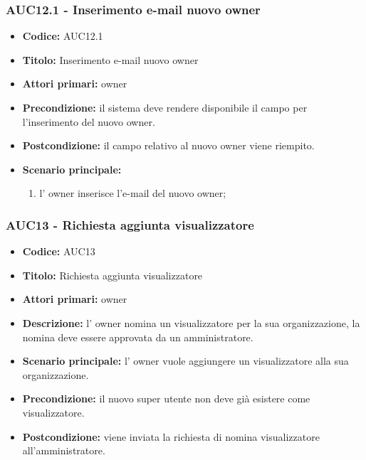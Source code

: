 \documentclass[casi-duso]{subfiles}
\begin{document}
\subsubsection{AUC12.1 - Inserimento e-mail nuovo owner}%
\label{subsub:AUC12.1}
\begin{itemize}
  \item \textbf{Codice:} AUC12.1
  \item \textbf{Titolo:} Inserimento e-mail nuovo owner
  \item \textbf{Attori primari:} owner
  \item \textbf{Precondizione:} il sistema deve rendere disponibile il campo per l'inserimento del nuovo owner.
  \item \textbf{Postcondizione:} il campo relativo al nuovo owner viene riempito.
  \item \textbf{Scenario principale:} 
  \begin{enumerate}
    \item l' owner inserisce l'e-mail del nuovo owner;
  \end{enumerate}
\end{itemize}

\subsubsection{AUC13 - Richiesta aggiunta visualizzatore}%
\label{subsub:AUC13}
\begin{itemize}
  \item \textbf{Codice:} AUC13
  \item \textbf{Titolo:} Richiesta aggiunta visualizzatore
  \item \textbf{Attori primari:} owner
  \item \textbf{Descrizione:} l' owner nomina un visualizzatore per la sua organizzazione, la nomina deve essere approvata da un amministratore.
  \item \textbf{Scenario principale:} l' owner vuole aggiungere un visualizzatore alla sua organizzazione.
  \item \textbf{Precondizione:} il nuovo super utente non deve già esistere come visualizzatore.
  \item \textbf{Postcondizione:} viene inviata la richiesta di nomina visualizzatore all'amministratore.
\end{itemize}
\end{document}
